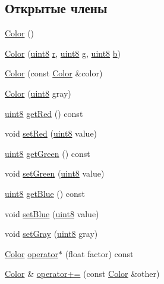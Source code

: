 \subsection*{Открытые члены}
\begin{DoxyCompactItemize}
\item 
\hyperlink{class_color_a9a742cbe9f9f4037f5d9f4e81a9b2428}{Color} ()
\item 
\hyperlink{class_color_a9e2a61644848b70eff8103fe538e1b30}{Color} (\hyperlink{number_8h_adde6aaee8457bee49c2a92621fe22b79}{uint8} \hyperlink{class_color_ac25ae2b764ad9bbf8b8c79141f84d4ae}{r}, \hyperlink{number_8h_adde6aaee8457bee49c2a92621fe22b79}{uint8} \hyperlink{class_color_a895f2e61ca018a91877f52021f8748bd}{g}, \hyperlink{number_8h_adde6aaee8457bee49c2a92621fe22b79}{uint8} \hyperlink{class_color_a177ce5853f9bb12fda1c545dfb6f4ddf}{b})
\item 
\hyperlink{class_color_a7b075d27e3bbdde7cbe648dc3b804261}{Color} (const \hyperlink{class_color}{Color} \&color)
\item 
\hyperlink{class_color_a03aa495dec904466b0986feaa884bb8b}{Color} (\hyperlink{number_8h_adde6aaee8457bee49c2a92621fe22b79}{uint8} gray)
\item 
\hyperlink{number_8h_adde6aaee8457bee49c2a92621fe22b79}{uint8} \hyperlink{class_color_aaf34b98c81cfe8ec2682cc38761a4d5c}{get\+Red} () const 
\item 
void \hyperlink{class_color_a0db91f928764aa5fef82e92f55e34a2f}{set\+Red} (\hyperlink{number_8h_adde6aaee8457bee49c2a92621fe22b79}{uint8} value)
\item 
\hyperlink{number_8h_adde6aaee8457bee49c2a92621fe22b79}{uint8} \hyperlink{class_color_affb4bc39163b1c057e338125ed377494}{get\+Green} () const 
\item 
void \hyperlink{class_color_a35f06f6d8e5b2e57366ce2b3911b8d34}{set\+Green} (\hyperlink{number_8h_adde6aaee8457bee49c2a92621fe22b79}{uint8} value)
\item 
\hyperlink{number_8h_adde6aaee8457bee49c2a92621fe22b79}{uint8} \hyperlink{class_color_ad3adb9f5cc739957f9dbf053d2641de2}{get\+Blue} () const 
\item 
void \hyperlink{class_color_a957be1669566c9422dc48595d21547a1}{set\+Blue} (\hyperlink{number_8h_adde6aaee8457bee49c2a92621fe22b79}{uint8} value)
\item 
void \hyperlink{class_color_a0524f53d56d0e27be194f3c02644c6da}{set\+Gray} (\hyperlink{number_8h_adde6aaee8457bee49c2a92621fe22b79}{uint8} gray)
\item 
\hyperlink{class_color}{Color} \hyperlink{class_color_ab9427899af3ac7ef621c81a49633d1cb}{operator$\ast$} (float factor) const 
\item 
\hyperlink{class_color}{Color} \& \hyperlink{class_color_a26fc45655619e26ab7606823e39d80eb}{operator+=} (const \hyperlink{class_color}{Color} \&other)
\end{DoxyCompactItemize}
